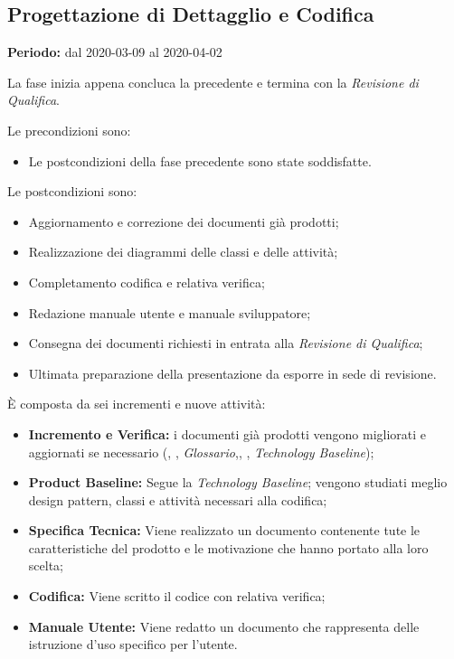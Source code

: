 \subsection{Progettazione di Dettagglio e Codifica}
\label{progettazione_di_dettaglio}
\textbf{Periodo:} dal 2020-03-09 al 2020-04-02 

La fase inizia appena concluca la precedente e termina con la \textit{Revisione di Qualifica}. 

Le precondizioni sono:
\begin{itemize}
    \item Le postcondizioni della fase precedente sono state soddisfatte.
\end{itemize}

Le postcondizioni sono:
\begin{itemize}
    \item Aggiornamento e correzione dei documenti già prodotti;
    \item Realizzazione dei diagrammi delle classi e delle attività;
    \item Completamento codifica e relativa verifica;
    \item Redazione manuale utente e manuale sviluppatore;
    \item Consegna dei documenti richiesti in entrata alla \textit{Revisione di Qualifica};
    \item Ultimata preparazione della presentazione da esporre in sede di revisione.
\end{itemize}

È composta da sei incrementi e nuove attività:

\begin{itemize}
    \item \textbf{Incremento e Verifica:} i documenti già prodotti vengono migliorati e aggiornati se necessario (\textit{\NdP}, \textit{\PdP}, \textit{Glossario},\textit{\PdQ}, \textit{\AdR}, \textit{Technology Baseline}); 
    \item \textbf{Product Baseline:} Segue la \textit{Technology Baseline}; vengono studiati meglio design pattern, classi e attività necessari alla codifica;
    \item \textbf{Specifica Tecnica:} Viene realizzato un documento contenente tute le caratteristiche del prodotto e le motivazione che hanno portato alla loro scelta;
    \item \textbf{Codifica:} Viene scritto il codice con relativa verifica;
    \item \textbf{Manuale Utente:} Viene redatto un documento che rappresenta delle istruzione d'uso specifico per l'utente.
\end{itemize}

